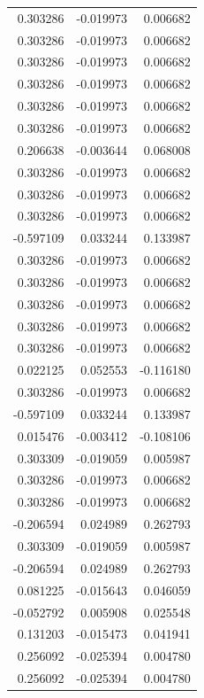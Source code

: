 \documentclass[a4paper,twoside,12pt]{book}
\begin{document}
\begin{appendices}
\begin{table}
\begin{tabular}{rrr}
	 0.303286 & -0.019973 &  0.006682 \\
	 0.303286 & -0.019973 &  0.006682 \\
	 0.303286 & -0.019973 &  0.006682 \\
	 0.303286 & -0.019973 &  0.006682 \\
	 0.303286 & -0.019973 &  0.006682 \\
	 0.303286 & -0.019973 &  0.006682 \\
	 0.206638 & -0.003644 &  0.068008 \\
	 0.303286 & -0.019973 &  0.006682 \\
	 0.303286 & -0.019973 &  0.006682 \\
	 0.303286 & -0.019973 &  0.006682 \\
	-0.597109 &  0.033244 &  0.133987 \\
	 0.303286 & -0.019973 &  0.006682 \\
	 0.303286 & -0.019973 &  0.006682 \\
	 0.303286 & -0.019973 &  0.006682 \\
	 0.303286 & -0.019973 &  0.006682 \\
	 0.303286 & -0.019973 &  0.006682 \\
	 0.022125 &  0.052553 & -0.116180 \\
	 0.303286 & -0.019973 &  0.006682 \\
	-0.597109 &  0.033244 &  0.133987 \\
	 0.015476 & -0.003412 & -0.108106 \\
	 0.303309 & -0.019059 &  0.005987 \\
	 0.303286 & -0.019973 &  0.006682 \\
	 0.303286 & -0.019973 &  0.006682 \\
	-0.206594 &  0.024989 &  0.262793 \\
	 0.303309 & -0.019059 &  0.005987 \\
	-0.206594 &  0.024989 &  0.262793 \\
	 0.081225 & -0.015643 &  0.046059 \\
	-0.052792 &  0.005908 &  0.025548 \\
	 0.131203 & -0.015473 &  0.041941 \\
	 0.256092 & -0.025394 &  0.004780 \\
	 0.256092 & -0.025394 &  0.004780 \\
	\bottomrule
\end{tabular}
\end{table}


\end{appendices}
\end{document}
